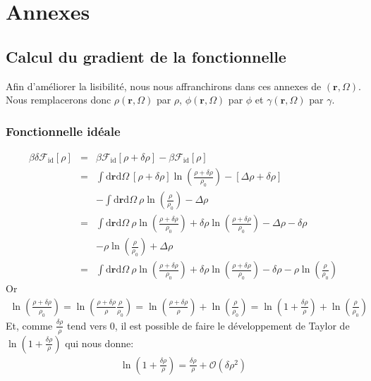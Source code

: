 \appendix

\part*{Annexes}

\chapter{Calcul du gradient de la fonctionnelle}
Afin d'améliorer la lisibilité, nous nous affranchirons dans ces annexes de $(\boldsymbol{r},\Omega)$. Nous remplacerons donc $\rho(\boldsymbol{r},\Omega)$ par $\rho$, $\phi(\boldsymbol{r},\Omega)$ par $\phi$ et $\gamma(\boldsymbol{r},\Omega)$ par $\gamma$.
\label{chap:annexes:grad}

\section{Fonctionnelle idéale}
\label{sec:annexes:grad:id}
\begin{eqnarray}
\beta \delta \mathcal{F}_\mathrm{id}[\rho] &=& \beta \mathcal{F}_\mathrm{id}[\rho + \delta \rho] -\beta \mathcal{F}_\mathrm{id}[\rho] \\
&=& \int\mathrm{d}\boldsymbol{r}\mathrm{d}\Omega\ [\rho + \delta \rho]\ln(\frac{\rho + \delta \rho}{\rho_0})- [\Delta\rho + \delta \rho] \\
& & - \int\mathrm{d}\boldsymbol{r}\mathrm{d}\Omega\ \rho\ln(\frac{\rho}{\rho_0})-\Delta\rho \nonumber \\
&=& \int\mathrm{d}\boldsymbol{r}\mathrm{d}\Omega\ \rho \ln(\frac{\rho + \delta \rho}{\rho_0}) + \delta \rho\ln(\frac{\rho + \delta \rho}{\rho_0}) - \Delta\rho - \delta\rho \\
& & - \rho\ln(\frac{\rho}{\rho_0}) + \Delta\rho \nonumber \\
&=& \int\mathrm{d}\boldsymbol{r}\mathrm{d}\Omega\ \rho \ln(\frac{\rho + \delta \rho}{\rho_0}) + \delta \rho\ln(\frac{\rho + \delta \rho}{\rho_0}) - \delta\rho - \rho\ln(\frac{\rho}{\rho_0})\nonumber
\end{eqnarray}
Or
\begin{eqnarray}
\ln(\frac{\rho + \delta \rho}{\rho_0}) = \ln(\frac{\rho + \delta \rho}{\rho}\frac{\rho}{\rho_0}) = \ln(\frac{\rho + \delta \rho}{\rho})+\ln(\frac{\rho}{\rho_0}) = \ln(1+\frac{\delta \rho}{\rho})+\ln(\frac{\rho}{\rho_0})
\end{eqnarray}
Et, comme $\frac{\delta \rho}{\rho}$ tend vers 0, il est possible de faire le développement de Taylor de $\ln(1+\frac{\delta \rho}{\rho})$ qui nous donne:
\begin{eqnarray}
\ln(1+\frac{\delta \rho}{\rho}) = \frac{\delta \rho}{\rho} + \mathcal{O}(\delta\rho^{2})
\end{eqnarray}

